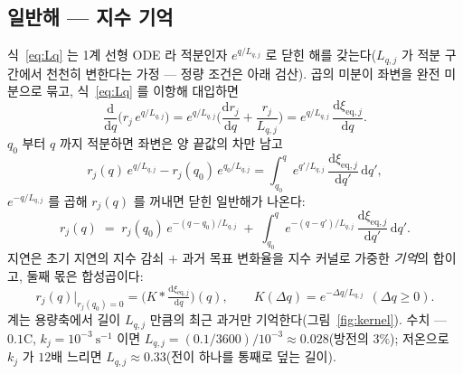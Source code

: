 \documentclass[11pt,a4paper]{article}
\newcommand{\dd}{\mathrm{d}}
\newcommand{\eq}{\mathrm{eq}}
\begin{document}
\subsection{일반해 — 지수 기억}
식~\eqref{eq:Lq} 는 1계 선형 ODE 라 적분인자 $e^{q/L_{q,j}}$ 로 닫힌 해를 갖는다($L_{q,j}$ 가 적분 구간에서 천천히 변한다는 가정 — 정량 조건은 아래 검산). 곱의 미분이 좌변을 완전 미분으로 묶고, 식~\eqref{eq:Lq} 를 이항해 대입하면
\begin{equation}
\frac{\dd}{\dd q}\Big(r_j\,e^{q/L_{q,j}}\Big)
=e^{q/L_{q,j}}\Big(\frac{\dd r_j}{\dd q}+\frac{r_j}{L_{q,j}}\Big)
=e^{q/L_{q,j}}\,\frac{\dd\xi_{\eq,j}}{\dd q}.
\label{eq:intfactor}
\end{equation}
$q_0$ 부터 $q$ 까지 적분하면 좌변은 양 끝값의 차만 남고
\begin{equation}
r_j(q)\,e^{q/L_{q,j}}-r_j(q_0)\,e^{q_0/L_{q,j}}
=\int_{q_0}^{q}e^{q'/L_{q,j}}\,\frac{\dd\xi_{\eq,j}}{\dd q'}\,\dd q',
\label{eq:intfacint}
\end{equation}
$e^{-q/L_{q,j}}$ 를 곱해 $r_j(q)$ 를 꺼내면 닫힌 일반해가 나온다:
\begin{equation}
r_j(q)\;=\;r_j(q_0)\,e^{-(q-q_0)/L_{q,j}}
\;+\;\int_{q_0}^{q}e^{-(q-q')/L_{q,j}}\,\frac{\dd\xi_{\eq,j}}{\dd q'}\,\dd q'.
\label{eq:memory}
\end{equation}
지연은 초기 지연의 지수 감쇠 $+$ 과거 목표 변화율을 지수 커널로 가중한 \emph{기억}의 합이고, 둘째 몫은 합성곱이다:
\begin{equation}
r_j(q)\Big|_{r_j(q_0)=0}
=\big(K*\tfrac{\dd\xi_{\eq,j}}{\dd q}\big)(q),
\qquad K(\Delta q)=e^{-\Delta q/L_{q,j}}\ \ (\Delta q\ge0).
\label{eq:conv}
\end{equation}
계는 용량축에서 길이 $L_{q,j}$ 만큼의 최근 과거만 기억한다(그림~\ref{fig:kernel}). 수치 — $0.1$C, $k_j=10^{-3}\ \mathrm{s^{-1}}$ 이면 $L_{q,j}=(0.1/3600)/10^{-3}\approx0.028$(방전의 $3\%$); 저온으로 $k_j$ 가 $12$배 느리면 $L_{q,j}\approx0.33$(전이 하나를 통째로 덮는 길이).
\end{document}
